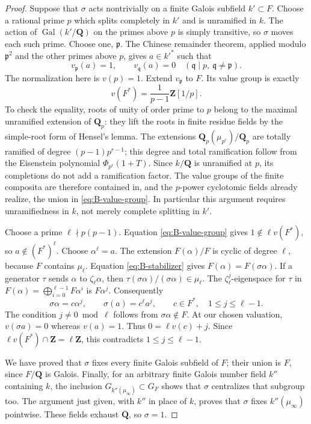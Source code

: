 \begin{proof}
Suppose that $\sigma$ acts nontrivially on a finite Galois subfield
$k'\subset F$. Choose a rational prime $p$ which splits completely in $k'$
and is unramified in $k$. The action of
$\operatorname{Gal}(k'/\mathbf Q)$ on the primes above $p$ is simply
transitive, so $\sigma$ moves each such prime. Choose one, $\mathfrak p$.
The Chinese remainder theorem, applied modulo $\mathfrak p^2$ and the
other primes above $p$, gives $a\in k'^*$ such that
\[
 v_{\mathfrak p}(a)=1,\qquad
 v_{\mathfrak q}(a)=0\quad(\mathfrak q\mid p,\ \mathfrak q\ne\mathfrak p).
\]
The normalization here is $v(p)=1$. Extend $v_{\mathfrak p}$ to $F$.
Its value group is exactly
\begin{equation}\label{eq:B-value-group}
 v(F^*)=\frac1{p-1}\mathbf Z[1/p].
\end{equation}
To check the equality, roots of unity of order prime to $p$ belong to the
maximal unramified extension of $\mathbf Q_p$: they lift the roots in finite
residue fields by the simple-root form of Hensel's lemma. The extensions
$\mathbf Q_p(\mu_{p^r})/\mathbf Q_p$ are totally ramified of degree
$(p-1)p^{r-1}$; this degree and total ramification follow from the
Eisenstein polynomial $\Phi_{p^r}(1+T)$.
Since $k/\mathbf Q$ is unramified at $p$, its completions do not add a
ramification factor. The value groups of the finite composita are therefore
contained in, and the $p$-power cyclotomic fields already realize, the union
in \eqref{eq:B-value-group}. In particular this argument requires
unramifiedness in $k$, not merely complete splitting in $k'$.

Choose a prime $\ell\nmid p(p-1)$. Equation \eqref{eq:B-value-group} gives
$1\notin\ell v(F^*)$, so $a\notin(F^*)^\ell$. Choose
$\alpha^\ell=a$. The extension $F(\alpha)/F$ is cyclic of degree $\ell$,
because $F$ contains $\mu_\ell$. Equation \eqref{eq:B-stabilizer} gives
$F(\alpha)=F(\sigma\alpha)$. If a generator $\tau$ sends
$\alpha$ to $\zeta_\ell\alpha$, then
$\tau(\sigma\alpha)/(\sigma\alpha)\in\mu_\ell$.
The $\zeta_\ell^j$-eigenspace for $\tau$ in
$F(\alpha)=\bigoplus_{i=0}^{\ell-1}F\alpha^i$ is $F\alpha^j$.
Consequently
\[
 \sigma\alpha=c\alpha^j,\qquad
 \sigma(a)=c^\ell a^j,
 \qquad c\in F^*,\quad 1\le j\le\ell-1.
\]
The condition $j\ne0\bmod\ell$ follows from $\sigma\alpha\notin F$.
At our chosen valuation, $v(\sigma a)=0$ whereas $v(a)=1$. Thus
$0=\ell v(c)+j$. Since
$\ell v(F^*)\cap\mathbf Z=\ell\mathbf Z$, this contradicts
$1\le j\le\ell-1$.

We have proved that $\sigma$ fixes every finite Galois subfield of $F$;
their union is $F$, since $F/\mathbf Q$ is Galois. Finally, for an arbitrary
finite Galois number field $k''$ containing $k$, the inclusion
$G_{k''(\mu_\infty)}\subset G_F$ shows that $\sigma$ centralizes that
subgroup too. The argument just given, with $k''$ in place of $k$, proves
that $\sigma$ fixes $k''(\mu_\infty)$ pointwise. These fields exhaust
$\overline{\mathbf Q}$, so $\sigma=1$.
\end{proof}



